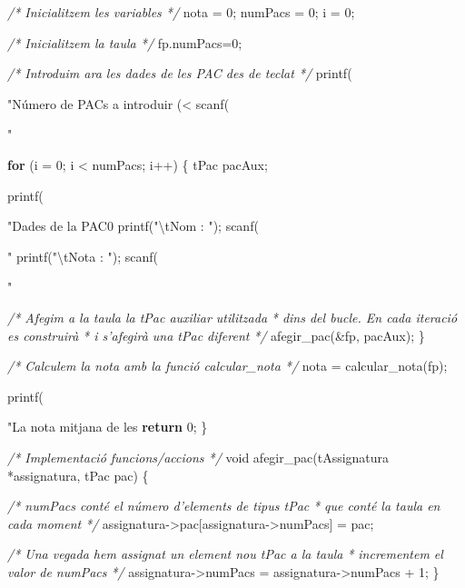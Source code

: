\documentclass[]{book}
\newenvironment{Shaded}{\begin{snugshade}}{\end{snugshade}}
\newcommand{\DataTypeTok}[1]{\textcolor[rgb]{0.13,0.29,0.53}{#1}}
\newcommand{\DecValTok}[1]{\textcolor[rgb]{0.00,0.00,0.81}{#1}}
\newcommand{\SpecialCharTok}[1]{\textcolor[rgb]{0.00,0.00,0.00}{#1}}
\newcommand{\StringTok}[1]{\textcolor[rgb]{0.31,0.60,0.02}{#1}}
\newcommand{\CommentTok}[1]{\textcolor[rgb]{0.56,0.35,0.01}{\textit{#1}}}
\newcommand{\ControlFlowTok}[1]{\textcolor[rgb]{0.13,0.29,0.53}{\textbf{#1}}}
\newcommand{\NormalTok}[1]{#1}
\begin{document}
\begin{Shaded}
\begin{Highlighting}[]
    \CommentTok{/* Inicialitzem les variables */}
\NormalTok{    nota = }\DecValTok{0}\NormalTok{;}
\NormalTok{    numPacs = }\DecValTok{0}\NormalTok{;}
\NormalTok{    i = }\DecValTok{0}\NormalTok{;}

    \CommentTok{/* Inicialitzem la taula */}
\NormalTok{    fp.numPacs=}\DecValTok{0}\NormalTok{;}

    \CommentTok{/* Introduim ara les dades de les PAC des de teclat */}
\NormalTok{    printf(}\StringTok{"Número de PACs a introduir (<%
\NormalTok{    scanf(}\StringTok{"%

    \ControlFlowTok{for}\NormalTok{ (i = }\DecValTok{0}\NormalTok{; i < numPacs; i++) \{}
\NormalTok{        tPac pacAux;}

\NormalTok{        printf(}\StringTok{"Dades de la PAC0%
\NormalTok{        printf(}\StringTok{"}\SpecialCharTok{\textbackslash{}t}\StringTok{Nom : "}\NormalTok{);}
\NormalTok{        scanf(}\StringTok{"%
\NormalTok{        printf(}\StringTok{"}\SpecialCharTok{\textbackslash{}t}\StringTok{Nota : "}\NormalTok{);}
\NormalTok{        scanf(}\StringTok{"%

        \CommentTok{/* Afegim a la taula la tPac auxiliar utilitzada}
\CommentTok{         * dins del bucle. En cada iteració es construirà}
\CommentTok{         * i s'afegirà una tPac diferent }
\CommentTok{         */}
\NormalTok{        afegir_pac(&fp, pacAux);}
\NormalTok{   \}}

   \CommentTok{/* Calculem la nota amb la funció calcular_nota */}
\NormalTok{   nota = calcular_nota(fp);}

\NormalTok{   printf(}\StringTok{"La nota mitjana de les %
   \ControlFlowTok{return} \DecValTok{0}\NormalTok{;}
\NormalTok{\}}

\CommentTok{/* Implementació funcions/accions */}
\DataTypeTok{void}\NormalTok{ afegir_pac(tAssignatura *assignatura, tPac pac) \{}

    \CommentTok{/* numPacs conté el número d'elements de tipus tPac}
\CommentTok{     * que conté la taula en cada moment }
\CommentTok{     */}
\NormalTok{    assignatura->pac[assignatura->numPacs] = pac;}

    \CommentTok{/* Una vegada hem assignat un element nou tPac a la taula}
\CommentTok{     * incrementem el valor de numPacs }
\CommentTok{     */}
\NormalTok{    assignatura->numPacs = assignatura->numPacs + }\DecValTok{1}\NormalTok{;}
\NormalTok{\}}

}}}}}}
\end{Highlighting}
\end{Shaded}
\end{document}
